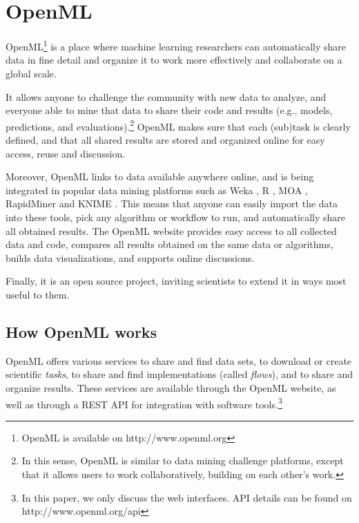 \documentclass{acmproc-sp}
\begin{document}

\section{OpenML}
\label{openml}
OpenML\footnote{OpenML is available on http://www.openml.org} is a place where machine learning researchers can automatically share data in fine detail and organize it to work more effectively and collaborate on a global scale.

It allows anyone to challenge the community with new data to analyze, and everyone able to mine that data to share their code and results (e.g., models, predictions, and evaluations).\footnote{In this sense, OpenML is similar to data mining challenge platforms, except that it allows users to work collaboratively, building on each other's work.} OpenML makes sure that each (sub)task is clearly defined, and that all shared results are stored and organized online for easy access, reuse and discussion.

Moreover, OpenML links to data available anywhere online, and is being integrated \cite{ecmldemo} in popular data mining platforms such as Weka \cite{Hall:2009p14495}, R \cite{mlr,Torgo:2010:DMR:1951702}, MOA \cite{Bifet:2010p28524}, RapidMiner \cite{RCOMM2013} and KNIME \cite{Berthold:2008p28224}. This means that anyone can easily import the data into these tools, pick any algorithm or workflow to run, and automatically share all obtained results. The OpenML website provides easy access to all collected data and code, compares all results obtained on the same data or algorithms, builds data visualizations, and supports online discussions.

Finally, it is an open source project, inviting scientists to extend it in ways most useful to them.

\subsection{How OpenML works}
OpenML offers various services to share and find data sets, to download or create scientific \textit{tasks}, to share and find implementations (called \textit{flows}), and to share and organize results. These services are available through the OpenML website, as well as through a REST API for integration with software tools.\footnote{In this paper, we only discuss the web interfaces. API details can be found on http://www.openml.org/api}
\end{document}
